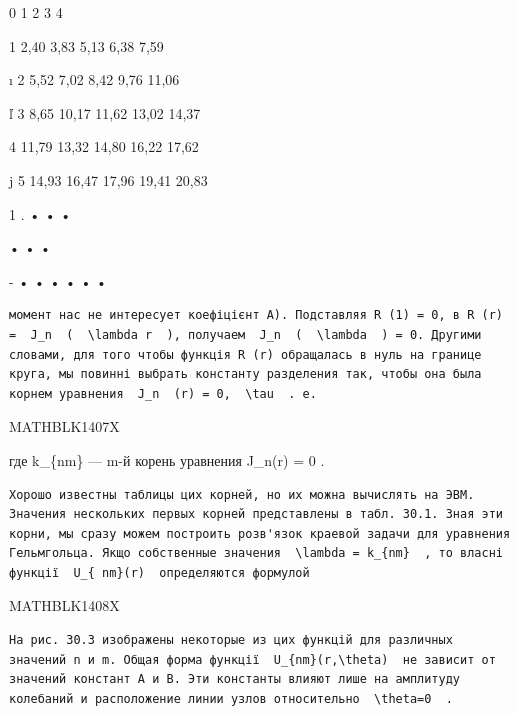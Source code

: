\documentclass[
  ukrainian,
]{article}
\begin{document}
\textbar{} \textbar{} 0 \textbar{} 1 \textbar{} 2 \textbar{} 3
\textbar{} 4 \textbar{} \textbar{} \textbar{}

\textbar{} 1 \textbar{} 2,40 \textbar{} 3,83 \textbar{} 5,13 \textbar{}
6,38 \textbar{} 7,59 \textbar{} \textbar{} \textbar{}

ı \textbar{} 2 \textbar{} 5,52 \textbar{} 7,02 \textbar{} 8,42
\textbar{} 9,76 \textbar{} 11,06 \textbar{} \textbar{} \textbar{}

ľ \textbar{} 3 \textbar{} 8,65 \textbar{} 10,17 \textbar{} 11,62
\textbar{} 13,02 \textbar{} 14,37 \textbar{} \textbar{} \textbar{}

\textbar{} 4 \textbar{} 11,79 \textbar{} 13,32 \textbar{} 14,80
\textbar{} 16,22 \textbar{} 17,62 \textbar{} \textbar{} \textbar{}

j \textbar{} 5 \textbar{} 14,93 \textbar{} 16,47 \textbar{} 17,96
\textbar{} 19,41 \textbar{} 20,83 \textbar{} \textbar{} \textbar{}

1 \textbar{} . \textbar{} • \textbar{} \textbar{} • \textbar{}
\textbar{} • \textbar{} \textbar{} \textbar{}

\textbar{} \textbar{} \textbar{} • \textbar{} \textbar{} • \textbar{} •
\textbar{} \textbar{} \textbar{}

- \textbar{} • \textbar{} • \textbar{} • \textbar{} • \textbar{} •
\textbar{} • \textbar{} \textbar{} \textbar{}

\begin{verbatim}
момент нас не интересует коефіцієнт A). Подставляя R (1) = 0, в R (r) =  J_n  (  \lambda r  ), получаем  J_n  (  \lambda  ) = 0. Другими словами, для того чтобы функція R (r) обращалась в нуль на границе круга, мы повинні выбрать константу разделения так, чтобы она была корнем уравнения  J_n  (r) = 0,  \tau  . e.
\end{verbatim}

MATHBLK1407X

где k\_\{nm\} --- m-й корень уравнения J\_n(r) = 0 .

\begin{verbatim}
Хорошо известны таблицы цих корней, но их можна вычислять на ЭВМ. Значения нескольких первых корней представлены в табл. 30.1. Зная эти корни, мы сразу можем построить розв'язок краевой задачи для уравнения Гельмгольца. Якщо собственные значения  \lambda = k_{nm}  , то власні функції  U_{ nm}(r)  определяются формулой
\end{verbatim}

MATHBLK1408X

\begin{verbatim}
На рис. 30.3 изображены некоторые из цих функцій для различных значений n и m. Общая форма функції  U_{nm}(r,\theta)  не зависит от значений констант A и B. Эти константы влияют лише на амплитуду колебаний и расположение линии узлов относительно  \theta=0  .
\end{verbatim}
\end{document}
